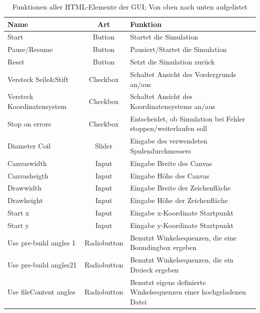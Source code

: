 \begin{table}[H]
\caption{Funktionen aller HTML-Elemente der GUI; Von oben nach unten aufgelistet}
\centering
\begin{tabular}{p{2cm}|c|p{4cm}}
Name & Art & Funktion \\
\hline
Start & Button & Startet die Simulation \\
Pause/Resume & Button & Pausiert/Startet die Simulation \\
Reset & Button & Setzt die Simulation zurück \\
Versteck Seile\&Stift & Checkbox & Schaltet Ansicht des Vordergrunds an/aus \\
Versteck Koordinatensystem & Checkbox & Schaltet Ansicht des Koordinatensystems an/aus \\
Stop on errors & Checkbox & Entscheidet, ob Simulation bei Fehler stoppen/weiterlaufen soll \\
Diameter Coil & Slider & Eingabe des verwendeten Spulendurchmessers \\
Canvaswidth & Input & Eingabe Breite des Canvas \\
Canvasheigth & Input & Eingabe Höhe des Canvas \\
Drawwidth & Input & Eingabe Breite der Zeichenfläche \\
Drawheight & Input & Eingabe Höhe der Zeichenfläche \\
Start x & Input & Eingabe x-Koordinate Startpunkt \\
Start y & Input & Eingabe y-Koordinate Startpunkt \\
Use pre-build angles 1 & Radiobutton & Benutzt Winkelsequenzen, die eine Boundingbox ergeben \\
Use pre-build angles21 & Radiobutton & Benutzt Winkelsequenzen, die ein Dreieck ergeben \\
Use fileContent angles & Radiobutton & Benutzt eigens definierte Winkelsequenzen einer hochgeladenen Datei
\end{tabular}
\label{tab:gui_funcs}
\end{table}